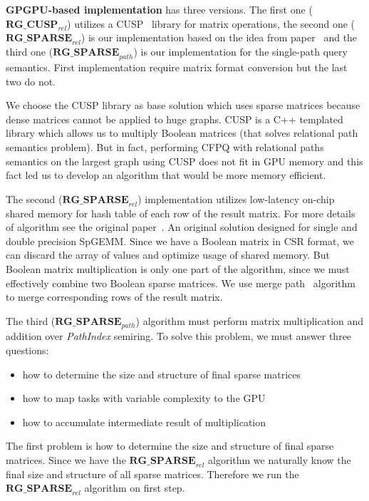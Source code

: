 \textbf{GPGPU-based implementation} has three versions.
The first one ($\textbf{RG\_CUSP}_{rel}$) utilizes a CUSP~\cite{Cusp} library for matrix operations, the second one ($\textbf{RG\_SPARSE}_{rel}$) is our implementation based on the idea from paper~\cite{NsparsePaper} and the third one ($\textbf{RG\_SPARSE}_{path}$) is our implementation for the single-path query semantics.
First implementation require matrix format conversion but the last two do not.

We choose the CUSP library as base solution which uses sparse matrices because dense matrices cannot be applied to huge graphs. CUSP is a C++ templated library which allows us to multiply Boolean matrices (that solves relational path semantics problem). But in fact, performing CFPQ with relational paths semantics on the largest graph using CUSP does not fit in GPU memory and this fact led us to develop an algorithm that would be more memory efficient.

The second ($\textbf{RG\_SPARSE}_{rel}$) implementation utilizes low-latency on-chip shared memory for hash table of each row of the result matrix. For more details of algorithm see the original paper~\cite{NsparsePaper}. An original solution designed for single and double precision SpGEMM. Since we have a Boolean matrix in CSR format, we can discard the array of values and optimize usage of shared memory. But Boolean matrix multiplication is only one part of the algorithm, since we must effectively combine two Boolean sparse matrices. We use merge path~\cite{GpuMergePathPaper} algorithm to merge corresponding rows of the result matrix.

The third ($\textbf{RG\_SPARSE}_{path}$) algorithm must perform matrix multiplication and addition over \textit{PathIndex} semiring. To solve this problem, we must answer three questions: 

\begin{itemize}
  \item how to determine the size and structure of final sparse matrices
  \item how to map tasks with variable complexity to the GPU
  \item how to accumulate intermediate result of multiplication
\end{itemize}

The first problem is how to determine the size and structure of final sparse matrices. Since we have the $\textbf{RG\_SPARSE}_{rel}$ algorithm we naturally know the final size and structure of all sparse matrices. Therefore we run the $\textbf{RG\_SPARSE}_{rel}$ algorithm on first step.


